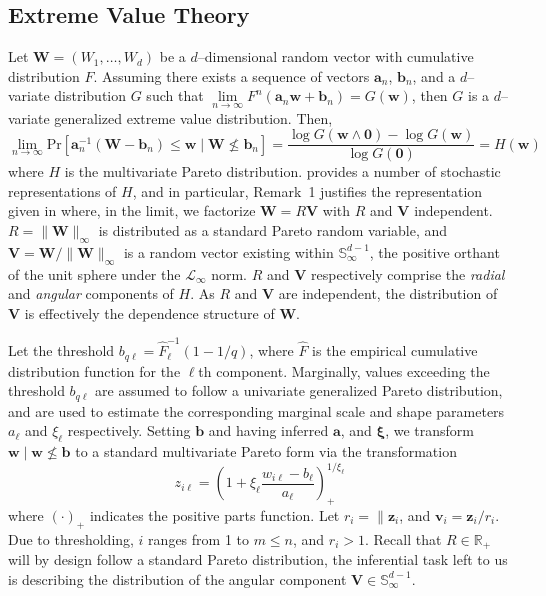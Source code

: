 \subsection{Extreme Value Theory}
Let $\bm{W} = (W_1,\ldots,W_d)$ be a $d$--dimensional random vector with 
    cumulative distribution $F$.  Assuming there exists a sequence of vectors
    $\bm{a}_n$, $\bm{b}_n$, and a $d$--variate distribution $G$ such that 
    $\lim\limits_{n\to\infty}F^n(\bm{a}_n\bm{w} + \bm{b}_n) = G(\bm{w})$, then
    $G$ is a $d$--variate generalized extreme value distribution.  Then,
    \[
        \lim\limits_{n\to\infty}\text{Pr}
            \left[\bm{a}_n^{-1}(\bm{W} - \bm{b}_n) 
                \leq \bm{w}\mid \bm{W}\not\leq \bm{b}_n\right]
        = \frac{\log G(\bm{w}\wedge \bm{0}) - \log G(\bm{w})}{\log G(\bm{0})}
        = H(\bm{w})
    \]
    where $H$ is the multivariate Pareto distribution.  \cite{rootzen2018}
    provides a number of stochastic representations of $H$, and in particular,
    Remark~1 justifies the representation given in \cite{ferreira2014} where,
    in the limit, we factorize $\bm{W} = R\bm{V}$ with $R$ and $\bm{V}$ independent.
    $R = \lVert \bm{W}\rVert_{\infty}$ is distributed as a standard Pareto random
    variable, and $\bm{V} = \bm{W} / \lVert \bm{W}\rVert_{\infty}$ is a random
    vector existing within $\mathbb{S}_{\infty}^{d-1}$, the positive orthant of
    the unit sphere under the $\mathcal{L}_{\infty}$ norm.  $R$ and $\bm{V}$
    respectively comprise the \emph{radial} and \emph{angular} components of $H$.
    As $R$ and $\bm{V}$ are independent,  the distribution of $\bm{V}$ is 
    effectively the dependence structure of $\bm{W}$.

Let the threshold $b_{q\ell} = \hat{F}_{\ell}^{-1}(1 - 1/q)$, where $\hat{F}$ is
    the empirical cumulative distribution function for the $\ell$th component.
    Marginally, values exceeding the threshold $b_{q\ell}$ are assumed to follow
    a univariate generalized Pareto distribution, and are used to estimate the
    corresponding marginal scale and shape parameters $a_{\ell}$ and $\xi_{\ell}$
    respectively.  Setting $\bm{b}$ and having inferred $\bm{a}$, and $\bm{\xi}$, 
    we transform $\bm{w}\mid \bm{w}\not\leq \bm{b}$ to a standard multivariate 
    Pareto form via the transformation
    \begin{equation}
        z_{i\ell} = \left(1 + \xi_{\ell}\frac{w_{i\ell} 
            - b_{\ell}}{a_{\ell}}\right)_{+}^{1 / \xi_{\ell}}
    \end{equation}
    where $(\cdot)_+$ indicates the positive parts function.  Let 
    $r_i = \lVert \bm{z}_i$, and $\bm{v}_i = \bm{z}_i / r_i$.  Due to 
    thresholding, $i$ ranges from 1 to $m\leq n$, and $r_i > 1$.  Recall that
    $R\in\mathbb{R}_+$ will by design follow a standard Pareto distribution,
    the inferential task left to us is describing the distribution of the
    angular component $\bm{V}\in\mathbb{S}_{\infty}^{d-1}$.  

